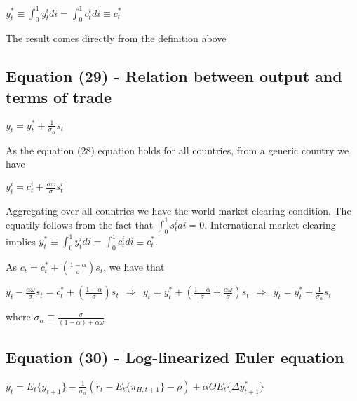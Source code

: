 \documentclass[
]{article}
\begin{document}
\(\displaystyle y_t^* \equiv \int_0^1y_t^i di=\int_0^1 c_t^i di \equiv c_t^*\)

\vspace{8pt}

The result comes directly from the definition above

\vspace{12pt}

\hypertarget{equation-29---relation-between-output-and-terms-of-trade}{%
\subsection{Equation (29) - Relation between output and terms of
trade}\label{equation-29---relation-between-output-and-terms-of-trade}}

\(\displaystyle y_t = y_t^* + \frac{1}{\sigma_\alpha}s_t\)

\vspace{8pt}

As the equation (28) equation holds for all countries, from a generic
country we have

\(\displaystyle y_t^i=c_t^i+ \frac{\alpha \omega}{\sigma} s_t^i\)

Aggregating over all countries we have the world market clearing
condition. The equatily follows from the fact that
\(\int_0^1 s_t^i di =0\). International market clearing implies
\(y_t^* \equiv \int_0^1y_t^idi = \int_0^1c_t^idi \equiv c_t^*\).

As
\(\displaystyle c_t = c_t^* + \left(\frac{1-\alpha}{\sigma} \right)s_t\),
we have that

\(\displaystyle y_t - \frac{\alpha \omega}{\sigma}s_t = c_t^* + \left(\frac{1-\alpha}{\sigma} \right)s_t \ \ \Rightarrow \ \ y_t = y_t^* + \left(\frac{1-\alpha}{\sigma} + \frac{\alpha \omega}{\sigma} \right)s_t \ \ \Rightarrow \ \ y_t = y_t^* + \frac{1}{\sigma_\alpha}s_t\)

where
\(\displaystyle \sigma_\alpha \equiv \frac{\sigma}{(1-\alpha)+ \alpha \omega}\)

\vspace{12pt}

\hypertarget{equation-30---log-linearized-euler-equation}{%
\subsection{Equation (30) - Log-linearized Euler
equation}\label{equation-30---log-linearized-euler-equation}}

\(\displaystyle y_t= E_t\{y_{t+1}\} -\frac{1}{\sigma_\alpha}(r_t-E_t\{\pi_{H,t+1}\} -\rho)+ \alpha \Theta E_t\{\Delta y_{t+1}^*\}\)
\end{document}
